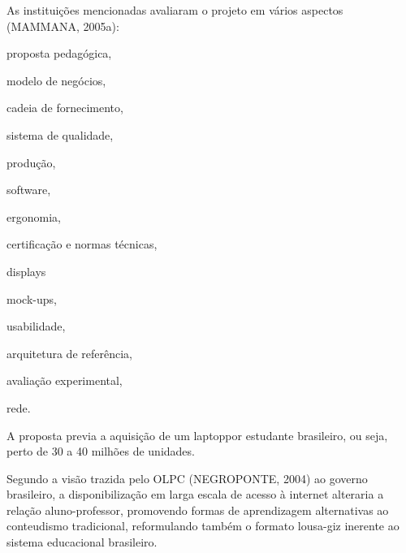 \documentclass[
12pt,		%
openright,	%
twoside,  %
a4paper,			%
chapter=TITLE,		%
english,			%
french,				%
spanish,			%
brazil				%
]{USPSC-classe/USPSC}
\begin{document}
\noindent\begin{center}\mbox{\centering{}}\end{center}


As institui\c{c}\~oes mencionadas avaliaram o projeto em v\'arios aspectos  (MAMMANA, 2005a):


















\begin{alineas}
\item proposta pedag\'ogica,
\item modelo de neg\'ocios,
\item cadeia de fornecimento,
\item sistema de qualidade,
\item produ\c{c}\~ao,
\item software,
\item ergonomia,
\item certifica\c{c}\~ao e normas t\'ecnicas,
\item displays
\item mock-ups,
\item usabilidade,
\item arquitetura de refer\^encia,
\item avalia\c{c}\~ao experimental,
\item rede.
\end{alineas}

A proposta previa a aquisi\c{c}\~ao de um \textquotedbl laptop\textquotedbl  por estudante brasileiro, ou seja, perto de 30 a 40 milh\~oes de unidades.

















Segundo a vis\~ao trazida pelo OLPC  (NEGROPONTE, 2004) ao governo brasileiro, a disponibiliza\c{c}\~ao em larga escala de acesso \`a internet alteraria a rela\c{c}\~ao aluno-professor, promovendo formas de aprendizagem alternativas ao conteudismo tradicional, reformulando tamb\'em o formato lousa-giz inerente ao sistema educacional brasileiro.
\end{document}
